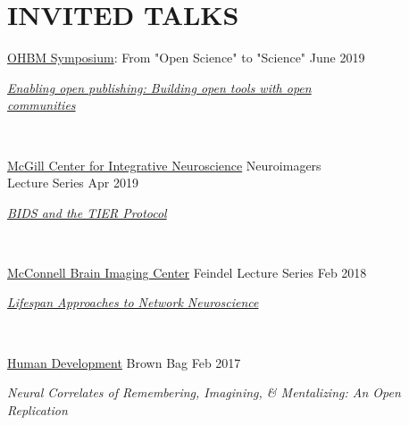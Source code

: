 \documentclass{dupre-cv}
\begin{document}
\section{INVITED TALKS}

\href{https://www.humanbrainmapping.org/m/pages.cfm?pageID=3920}{OHBM Symposium}: From "Open Science" to "Science" \hfill June 2019 \\[0.15cm]
\begin{minipage}{10cm}
\textit{\href{https://figshare.com/articles/Enabling_Open_Publishing_Building_Open_Tools_with_Open_Communities/8292269}{Enabling open publishing: Building open tools with open \\ communities}}
\end{minipage} \\
\vspace{5pt}

\href{https://mcin.ca/}{McGill Center for Integrative Neuroscience} Neuroimagers \\  Lecture Series \hfill Apr 2019 \\[0.15cm]
\begin{minipage}{10cm}
\textit{\href{https://docs.google.com/presentation/d/1UD63tmmFgszhjKA3EjpmPXUBzjyoBNx2Y0jnhTolw2M/}{BIDS and the TIER Protocol}}
\end{minipage} \\
\vspace{5pt}

\href{https://www.mcgill.ca/bic/home}{McConnell Brain Imaging Center} Feindel Lecture Series \hfill Feb 2018 \\[0.15cm]
\begin{minipage}{10cm}
\textit{\href{http://emdupre.me/feindel-slides}{Lifespan Approaches to Network Neuroscience}}
\end{minipage} \\
\vspace{5pt}

\href{http://www.human.cornell.edu/hd/}{Human Development} Brown Bag \hfill Feb 2017 \\[0.15cm]
\begin{minipage}{10cm}
\textit{Neural Correlates of Remembering, Imagining, \& Mentalizing: An Open Replication}
\end{minipage} \\
\vspace{10pt}
\end{document}
